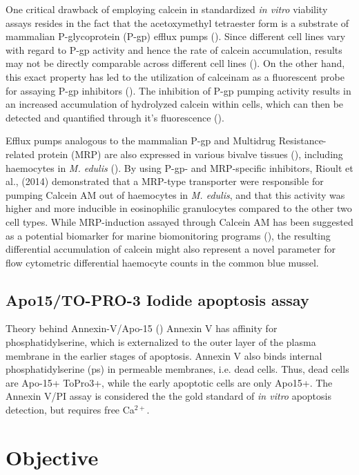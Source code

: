 One critical drawback of employing calcein in standardized \emph{in vitro} viability assays resides in the fact that the acetoxymethyl tetraester form is a substrate of mammalian P-glycoprotein (P-gp) efflux pumps (\cite{Liminga1995}). Since different cell lines vary with regard to P-gp activity and hence the rate of calcein accumulation, results may not be directly comparable across different cell lines (\cite{Ramirez2010}). On the other hand, this exact property has led to the utilization of \acrshort{calceinam} as a fluorescent probe for assaying P-gp inhibitors (\cite{Di2016}). The inhibition of P-gp pumping activity results in an increased accumulation of hydrolyzed calcein within cells, which can then be detected and quantified through it's fluorescence (\cite{Tiberghien1996, Köhler2003}).

Efflux pumps analogous to the mammalian P-gp and Multidrug Resistance-related protein (MRP) are also expressed in various bivalve tissues (\cite{Luckenbach2008, Luedeking2005}), including haemocytes in \emph{M. edulis} (\cite{Rioult2014}). By using P-gp- and MRP-specific inhibitors, Rioult et al., (2014) demonstrated that a MRP-type transporter were responsible for pumping Calcein AM out of haemocytes in \emph{M. edulis}, and that this activity was higher and more inducible in eosinophilic granulocytes compared to the other two cell types. While MRP-induction assayed through Calcein AM has been suggested as a potential biomarker for marine biomonitoring programs (\cite{Rioult2014, Minier1998}), the resulting differential accumulation of calcein might also represent a novel parameter for flow cytometric differential haemocyte counts in the common blue mussel.

\subsection{Apo15/TO-PRO-3 Iodide apoptosis assay}
Theory behind Annexin-V/Apo-15 (\cite{Barth2020}) Annexin V has affinity for phosphatidylserine, which is externalized to the outer layer of the plasma membrane in the earlier stages of apoptosis. Annexin V also binds internal phosphatidylserine (\acrshort{ps}) in permeable membranes, i.e. dead cells. Thus, dead cells are Apo-15+ ToPro3+, while the early apoptotic cells are only Apo15+. The Annexin V/PI assay is considered the the gold standard of \emph{in vitro} apoptosis detection, but requires free Ca$^{2+}$.


\section{Objective}
